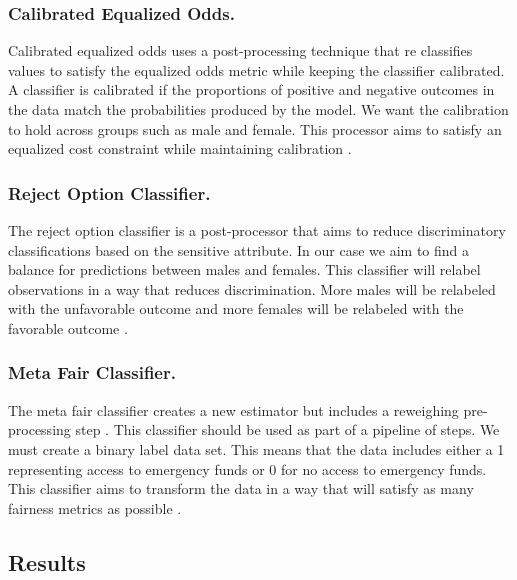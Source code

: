 \documentclass[water,article,submit,moreauthors,pdftex]{mdpi}
\begin{document}
\hypertarget{calibrated-equalized-odds.}{%
\subsubsection{Calibrated Equalized
Odds.}\label{calibrated-equalized-odds.}}

Calibrated equalized odds uses a post-processing technique that re
classifies values to satisfy the equalized odds metric while keeping the
classifier calibrated. A classifier is calibrated if the proportions of
positive and negative outcomes in the data match the probabilities
produced by the model. We want the calibration to hold across groups
such as male and female. This processor aims to satisfy an equalized
cost constraint while maintaining calibration
\citep{pleiss2017fairness}.

\hypertarget{reject-option-classifier.}{%
\subsubsection{Reject Option
Classifier.}\label{reject-option-classifier.}}

The reject option classifier is a post-processor that aims to reduce
discriminatory classifications based on the sensitive attribute. In our
case we aim to find a balance for predictions between males and females.
This classifier will relabel observations in a way that reduces
discrimination. More males will be relabeled with the unfavorable
outcome and more females will be relabeled with the favorable outcome
\citep{kamiran2012decision}.

\hypertarget{meta-fair-classifier.}{%
\subsubsection{Meta Fair Classifier.}\label{meta-fair-classifier.}}

The meta fair classifier creates a new estimator but includes a
reweighing pre-processing step \citep{celis2019classification}. This
classifier should be used as part of a pipeline of steps. We must create
a binary label data set. This means that the data includes either a 1
representing access to emergency funds or 0 for no access to emergency
funds. This classifier aims to transform the data in a way that will
satisfy as many fairness metrics as possible
\citep{agarwal2018reductions}.

\hypertarget{results}{%
\subsection{Results}\label{results}}
\end{document}
